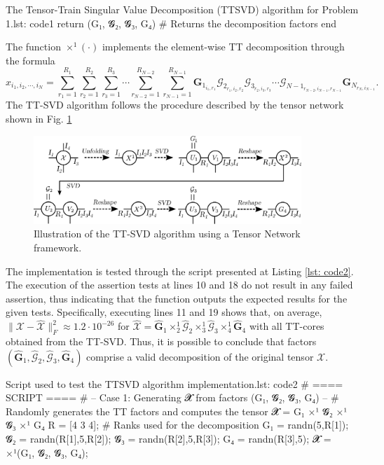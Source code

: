 \documentclass[a4paper,10pt]{article} %
\begin{document}
\begin{solution}
\begin{code}[0.95\textwidth]{The Tensor-Train Singular Value Decomposition (TTSVD) algorithm for Problem 1.}{lst: code1}
    return (G₁, 𝓖₂, 𝓖₃, G₄)                         # Returns the decomposition factors
end
    
\end{code} 

The function $\times^1(\cdot)$ implements the element-wise TT decomposition through the formula
$$
    x_{i_1,i_2,\cdots,i_N} = \sum_{r_1 = 1}^{R_1} \sum_{r_2 = 1}^{R_2} \sum_{r_3 = 1}^{R_3} \cdots \sum_{r_{N-2} = 1}^{R_{N-2}} \sum_{r_{N-1} = 1}^{R_{N-1}} \mathbf{G}_{1_{i_1,r_1}} \mathcal{G}_{2_{r_1,i_2,r_2}} \mathcal{G}_{3_{r_2,i_3,r_3}} \cdots \mathcal{G}_{{N-1}_{r_{N-2},i_{N-1},r_{N-1}}} \mathbf{G}_{N_{r_N,i_{N-1}}}.
$$
The TT-SVD algorithm follows the procedure described by the tensor network shown in Fig. \ref{fig: f1}

\begin{figure}[ht] \centering
    \includegraphics[width=0.9\textwidth]{imgs/TensorNetwork.pdf}
    \caption{Illustration of the TT-SVD algorithm using a Tensor Network framework.}
    \label{fig: f1}
\end{figure}

The implementation is tested through the script presented at Listing \ref{lst: code2}.
The execution of the assertion tests at lines 10 and 18 do not result in any failed assertion, thus indicating that the function outputs the expected results for the given tests. Specifically, executing lines 11 and 19 shows that, on average, $\| \mathcal{X} - \hat{\mathcal{X}} \|_F^2 \approx 1.2\cdot10^{-26}$ for $\hat{\mathcal{X}} = \hat{\mathbf{G}}_1 \times_2^1 \hat{\mathcal{G}}_2 \times_3^1 \hat{\mathcal{G}}_{3} \times_{4}^1 \hat{\mathbf{G}}_4$ with all TT-cores obtained from the TT-SVD. Thus, it is possible to conclude that factors $(\hat{\mathbf{G}}_1, \hat{\mathcal{G}}_2, \hat{\mathcal{G}}_3, \hat{\mathbf{G}}_4)$ comprise a valid decomposition of the original tensor $\mathcal{X}$. 

\begin{code}[0.9\textwidth]{Script used to test the TTSVD algorithm implementation.}{lst: code2}
# ==== SCRIPT ====
# -- Case 1: Generating 𝓧 from factors (G₁, 𝓖₂, 𝓖₃, G₄) --
# Randomly generates the TT factors and computes the tensor 𝓧 = G₁ ×¹ 𝓖₂ ×¹ 𝓖₃ ×¹ G₄
R = [4 3 4];     # Ranks used for the decomposition
G₁ = randn(5,R[1]); 𝓖₂ = randn(R[1],5,R[2]); 𝓖₃ = randn(R[2],5,R[3]); G₄ = randn(R[3],5);
𝓧 = ×¹(G₁, 𝓖₂, 𝓖₃, G₄);


\end{code}
\end{solution}
\end{document}
